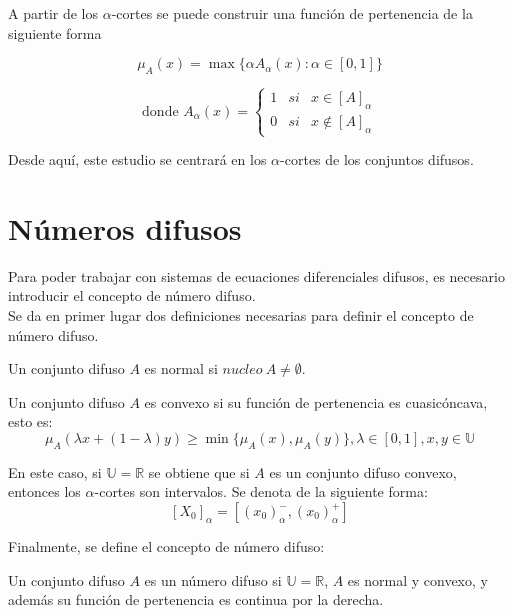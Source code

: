 A partir de los $\alpha$-cortes se puede construir una función de pertenencia de la siguiente forma \cite{apuntesfuzzy}

\[
\mu_A(x) = \max{\{\alpha A_\alpha(x) : \alpha \in [0, 1]}\}
\]

\[
\text{donde }A_\alpha(x) = \left\{
\begin{array}{ccc}
  1 & si & x \in [A]_\alpha \\
  0 & si & x \notin [A]_\alpha
\end{array}
\right.
\]

Desde aquí, este estudio se centrará en los $\alpha$-cortes de los conjuntos difusos.

\section{Números difusos}
Para poder trabajar con sistemas de ecuaciones diferenciales difusos, es necesario introducir el concepto de número difuso. \\
Se da en primer lugar dos definiciones necesarias para definir el concepto de número difuso.

\begin{definicion}
  \label{def:difuso_normal}
  Un conjunto difuso $A$ es normal si $nucleo ~ A \neq \emptyset$.
\end{definicion}

\begin{definicion}
  \label{def:difuso_convexo}
  Un conjunto difuso $A$ es convexo si su función de pertenencia es cuasicóncava, esto es:
  \[
  \mu_A(\lambda x + (1-\lambda)y) \geq \min{\{\mu_A(x), \mu_A(y)\}}, \lambda \in [0, 1], x, y \in \mathbb{U}
  \]
\end{definicion}

En este caso, si $\mathbb{U}=\mathbb{R}$ se obtiene que si $A$ es un conjunto difuso convexo, entonces los $\alpha$-cortes son intervalos. Se denota de la siguiente forma:
\[
  [X_0]_\alpha = [(x_0)_\alpha^- , (x_0)_\alpha^+]
  \]

  Finalmente, se define el concepto de número difuso:

  \begin{definicion}
    \label{def:numero_difuso}
    Un conjunto difuso $A$ es un número difuso si $\mathbb{U}=\mathbb{R}$, $A$ es normal y convexo, y además su función de pertenencia es continua por la derecha.
  \end{definicion}


